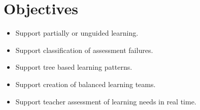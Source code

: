 \section{Objectives}

\begin{itemize}
\item Support partially or unguided learning.
\item Support classification of assessment failures.
\item Support tree based learning patterns.
\item Support creation of balanced learning teams.
\item Support teacher assessment of learning needs in real time.
\end{itemize}

